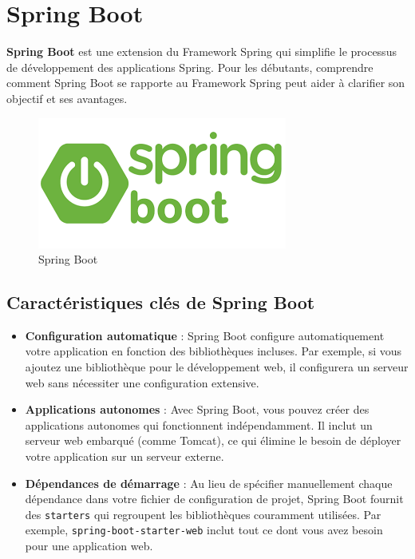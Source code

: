 \documentclass{article}
\begin{document}
\section{Spring Boot}

\textbf{Spring Boot} est une extension du Framework Spring qui simplifie le processus de développement des applications Spring. Pour les débutants, comprendre comment Spring Boot se rapporte au Framework Spring peut aider à clarifier son objectif et ses avantages.

\begin{figure}[H]
    \centering
    \begin{framed}
        \includegraphics[width=0.8\linewidth]{images/spring_boot_logo.png}
    \end{framed}
    \caption{Spring Boot}
\end{figure}

\subsection{Caractéristiques clés de Spring Boot} 
\begin{itemize}
    \item \textbf{Configuration automatique} : Spring Boot configure automatiquement votre application en fonction des bibliothèques incluses. Par exemple, si vous ajoutez une bibliothèque pour le développement web, il configurera un serveur web sans nécessiter une configuration extensive.

    \item \textbf{Applications autonomes} : 
    Avec Spring Boot, vous pouvez créer des applications autonomes qui fonctionnent indépendamment. Il inclut un serveur web embarqué (comme Tomcat), ce qui élimine le besoin de déployer votre application sur un serveur externe.

    \item \textbf{Dépendances de démarrage} : Au lieu de spécifier manuellement chaque dépendance dans votre fichier de configuration de projet, Spring Boot fournit des \texttt{starters} qui regroupent les bibliothèques couramment utilisées. Par exemple, \texttt{spring-boot-starter-web} inclut tout ce dont vous avez besoin pour une application web.
\end{itemize}
\end{document}
